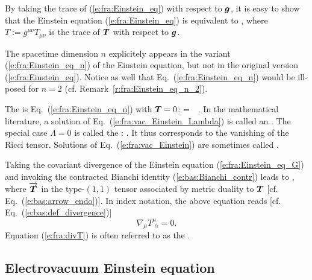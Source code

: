 By taking the trace of (\ref{e:fra:Einstein_eq}) with respect to $\bm{g}$, it is
easy to show that the Einstein equation (\ref{e:fra:Einstein_eq}) is
equivalent to
\be \label{e:fra:Einstein_eq_n}
    ,
\ee
where $T := g^{\mu\nu} T_{\mu\nu}$ is the trace of $\bm{T}$ with respect to
$\bm{g}$.

\begin{remark}
The spacetime dimension $n$ explicitely appears in the variant (\ref{e:fra:Einstein_eq_n})
of the Einstein equation, but not in the original version (\ref{e:fra:Einstein_eq}).
Notice as well that Eq.~(\ref{e:fra:Einstein_eq_n}) would be ill-posed for $n=2$
(cf. Remark~\ref{r:fra:Einstein_eq_n_2}).
\end{remark}

The  is
Eq.~(\ref{e:fra:Einstein_eq_n}) with $\bm{T}=0$:
\be \label{e:fra:vac_Einstein_Lambda}
      = \,\Lambda\,   .
\ee
In the mathematical literature, a solution of Eq.~(\ref{e:fra:vac_Einstein_Lambda})
is called an .
The special case $\Lambda=0$ is called the
:
 \be \label{e:fra:vac_Einstein}
    .
\ee
It thus corresponds to the vanishing of the Ricci tensor. Solutions of
Eq.~(\ref{e:fra:vac_Einstein}) are sometimes called
.

Taking the covariant divergence of the Einstein equation (\ref{e:fra:Einstein_eq_G})
and invoking the contracted Bianchi identity (\ref{e:bas:Bianchi_contr}) leads
to
\be \label{e:fra:divT}
    ,
\ee
where $\overrightarrow{\bm{T}}$ in the type-$(1,1)$ tensor associated by metric duality
to $\bm{T}$ [cf. Eq.~(\ref{e:bas:arrow_endo})]. In index notation, the above
equation reads [cf. Eq.~(\ref{e:bas:def_divergence})]
\[
    \nabla_\mu T^\mu_{\ \, \alpha} = 0 .
\]
Equation (\ref{e:fra:divT}) is often referred to as the .

\subsection{Electrovacuum Einstein equation} \label{e:fra:electrovacuum}

